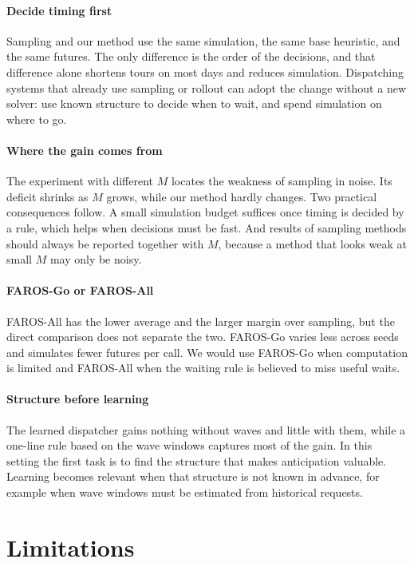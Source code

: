 \documentclass[5p,times,authoryear]{elsarticle}
\begin{document}
\paragraph{Decide timing first}
Sampling and our method use the same simulation, the same base heuristic, and the same futures. The only difference is the order of the decisions, and that difference alone shortens tours on most days and reduces simulation. Dispatching systems that already use sampling or rollout can adopt the change without a new solver: use known structure to decide when to wait, and spend simulation on where to go.

\paragraph{Where the gain comes from}
The experiment with different $M$ locates the weakness of sampling in noise. Its deficit shrinks as $M$ grows, while our method hardly changes. Two practical consequences follow. A small simulation budget suffices once timing is decided by a rule, which helps when decisions must be fast. And results of sampling methods should always be reported together with $M$, because a method that looks weak at small $M$ may only be noisy.

\paragraph{FAROS-Go or FAROS-All}
FAROS-All has the lower average and the larger margin over sampling, but the direct comparison does not separate the two. FAROS-Go varies less across seeds and simulates fewer futures per call. We would use FAROS-Go when computation is limited and FAROS-All when the waiting rule is believed to miss useful waits.

\paragraph{Structure before learning}
The learned dispatcher gains nothing without waves and little with them, while a one-line rule based on the wave windows captures most of the gain. In this setting the first task is to find the structure that makes anticipation valuable. Learning becomes relevant when that structure is not known in advance, for example when wave windows must be estimated from historical requests.

\section{Limitations}
\label{sec:limitations}
\end{document}
